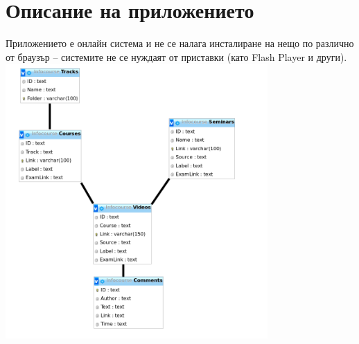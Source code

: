\documentclass[12pt]{article}
\begin{document}
	\section{Описание на приложението}
	Приложението е онлайн система и не се налага инсталиране на нещо по различно от браузър – системите не се нуждаят от приставки (като Flash Player и други).\\ 
	\includegraphics[width=0.75\textwidth]{mysql.png}\\
\end{document}
